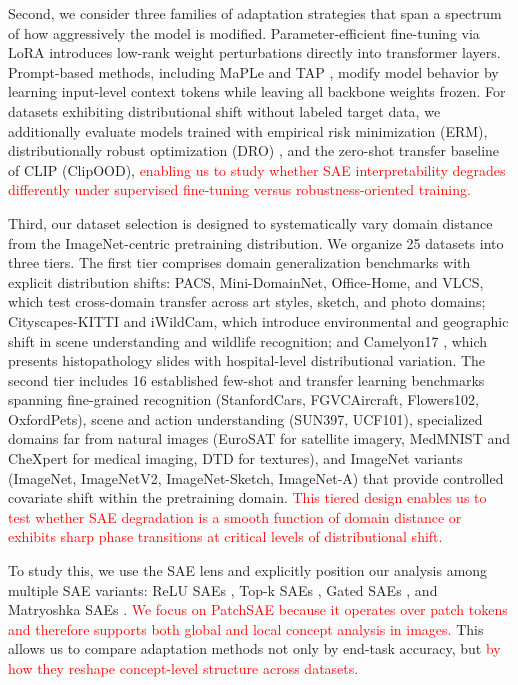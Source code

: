 Second, we consider three families of adaptation strategies that span a spectrum of how aggressively the model is modified. Parameter-efficient fine-tuning via LoRA \citep{hu2022lora} introduces low-rank weight perturbations directly into transformer layers. Prompt-based methods, including MaPLe \citep{khattak2023maple} and TAP \citep{ding2025tap}, modify model behavior by learning input-level context tokens while leaving all backbone weights frozen. For datasets exhibiting distributional shift without labeled target data, we additionally evaluate models trained with empirical risk minimization (ERM), distributionally robust optimization (DRO) \citep{sagawa2020distributionally}, and the zero-shot transfer baseline of CLIP (ClipOOD), \textcolor{red}{enabling us to study whether SAE interpretability degrades differently under supervised fine-tuning versus robustness-oriented training.}

Third, our dataset selection is designed to systematically vary domain distance from the ImageNet-centric pretraining distribution. We organize 25 datasets into three tiers. The first tier comprises domain generalization benchmarks with explicit distribution shifts: PACS, Mini-DomainNet, Office-Home, and VLCS, which test cross-domain transfer across art styles, sketch, and photo domains; Cityscapes-KITTI and iWildCam, which introduce environmental and geographic shift in scene understanding and wildlife recognition; and Camelyon17 \citep{bandi2018detection}, which presents histopathology slides with hospital-level distributional variation. The second tier includes 16 established few-shot and transfer learning benchmarks spanning fine-grained recognition (StanfordCars, FGVCAircraft, Flowers102, OxfordPets), scene and action understanding (SUN397, UCF101), specialized domains far from natural images (EuroSAT for satellite imagery, MedMNIST and CheXpert for medical imaging, DTD for textures), and ImageNet variants (ImageNet, ImageNetV2, ImageNet-Sketch, ImageNet-A) that provide controlled covariate shift within the pretraining domain. \textcolor{red}{This tiered design enables us to test whether SAE degradation is a smooth function of domain distance or exhibits sharp phase transitions at critical levels of distributional shift.}

To study this, we use the SAE lens and explicitly position our analysis among multiple SAE variants: ReLU SAEs \citep{cunningham2024sparse}, Top-k SAEs \citep{gao2025scaling}, Gated SAEs \citep{rajamanoharan2024improving}, and Matryoshka SAEs \citep{zaremba2025msae, bussmann2025matryoshka}. \textcolor{red}{We focus on PatchSAE \citep{lim2024patchsae} because it operates over patch tokens and therefore supports both global and local concept analysis in images.} This allows us to compare adaptation methods not only by end-task accuracy, but \textcolor{red}{by how they reshape concept-level structure across datasets.}


